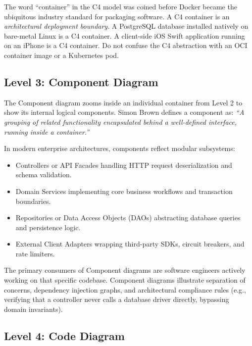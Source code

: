 \begin{commonmistakebox}
The word ``container'' in the C4 model was coined before Docker became the ubiquitous industry standard for packaging software. A C4 container is an \textit{architectural deployment boundary}. A PostgreSQL database installed natively on bare-metal Linux is a C4 container. A client-side iOS Swift application running on an iPhone is a C4 container. Do not confuse the C4 abstraction with an OCI container image or a Kubernetes pod.
\end{commonmistakebox}

\subsection{Level 3: Component Diagram}

The Component diagram zooms inside an individual container from Level 2 to show its internal logical components. Simon Brown defines a component as: \textit{``A grouping of related functionality encapsulated behind a well-defined interface, running inside a container.''}

In modern enterprise architectures, components reflect modular subsystems:
\begin{itemize}[leftmargin=14pt]
  \item Controllers or API Facades handling HTTP request deserialization and schema validation.
  \item Domain Services implementing core business workflows and transaction boundaries.
  \item Repositories or Data Access Objects (DAOs) abstracting database queries and persistence logic.
  \item External Client Adapters wrapping third-party SDKs, circuit breakers, and rate limiters.
\end{itemize}

The primary consumers of Component diagrams are software engineers actively working on that specific codebase. Component diagrams illustrate separation of concerns, dependency injection graphs, and architectural compliance rules (e.g., verifying that a controller never calls a database driver directly, bypassing domain invariants).

\subsection{Level 4: Code Diagram}

